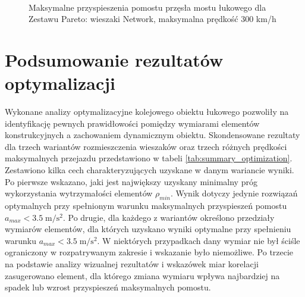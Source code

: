 \begin{figure}[hbt!]
	\centering
	\\
	\captionsetup{justification=centering}
	\caption{Maksymalne przyspieszenia pomostu przęsła mostu łukowego dla Zestawu Pareto: wieszaki Network, maksymalna prędkość 300 km/h}
	\label{fig:wk2_opti_netw_300_var_dom}
\end{figure}





\pagebreak[4]

\section{Podsumowanie rezultatów optymalizacji}

Wykonane analizy optymalizacyjne kolejowego obiektu łukowego pozwoliły na identyfikację pewnych prawidłowości pomiędzy wymiarami elementów konstrukcyjnych a zachowaniem dynamicznym obiektu. Skondensowane rezultaty dla trzech wariantów rozmieszczenia wieszaków oraz trzech różnych prędkości maksymalnych przejazdu przedstawiono w tabeli \ref{tab:summary_optimization}. Zestawiono kilka cech charakteryzujących uzyskane w danym wariancie wyniki. Po pierwsze wskazano, jaki jest największy uzyskany minimalny próg wykorzystania wytrzymałości elementów $\rho_{min}$. Wynik dotyczy jedynie rozwiązań optymalnych przy spełnionym warunku maksymalnych przyspieszeń pomostu $a_{max}<3.5\;\mathrm{m/s^2}$. Po drugie, dla każdego z wariantów określono przedziały wymiarów elementów, dla których uzyskano wyniki optymalne przy spełnieniu warunku $a_{max}<3.5\;\mathrm{m/s^2}$. W niektórych przypadkach dany wymiar nie był ściśle ograniczony w rozpatrywanym zakresie i wskazanie było niemożliwe. Po trzecie na podstawie analizy wizualnej rezultatów i wskazówek miar korelacji zasugerowano element, dla którego zmiana wymiaru wpływa najbardziej na spadek lub wzrost przyspieszeń maksymalnych pomostu. 

